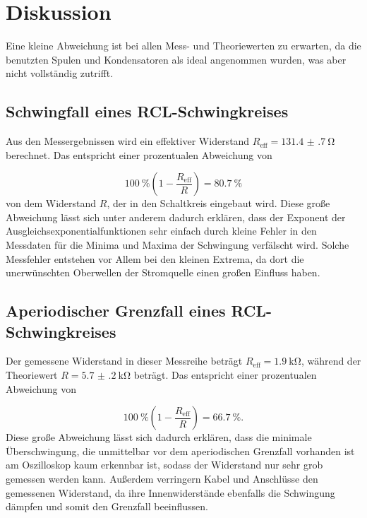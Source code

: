 \newpage

\section{Diskussion}
\label{sec:Diskussion}

Eine kleine Abweichung ist bei allen Mess- und Theoriewerten zu erwarten,
da die benutzten Spulen und Kondensatoren als ideal angenommen wurden, was
aber nicht vollständig zutrifft.

\subsection{Schwingfall eines RCL-Schwingkreises}

Aus den Messergebnissen wird ein effektiver Widerstand
$R_\text{eff} = \SI{131.4(7)}{\ohm}$ berechnet. Das entspricht einer
prozentualen Abweichung von

\begin{equation}
  \SI{100}{\percent} (1 - \frac{R_\text{eff}}{R}) = \SI{80.7}{\percent}
\end{equation}
von dem Widerstand $R$, der in den Schaltkreis eingebaut wird.
Diese große Abweichung lässt sich unter anderem dadurch erklären, dass
der Exponent der Ausgleichsexponentialfunktionen sehr einfach durch kleine
Fehler in den Messdaten für die Minima und Maxima der Schwingung verfälscht
wird. Solche Messfehler entstehen vor Allem bei den kleinen Extrema, da
dort die unerwünschten Oberwellen der Stromquelle einen großen Einfluss
haben.


\subsection{Aperiodischer Grenzfall eines RCL-Schwingkreises}

Der gemessene Widerstand in dieser Messreihe beträgt $R_\text{eff} =
\SI{1.9}{\kilo\ohm}$, während der Theoriewert
$R = \SI{5.7(2)}{\kilo\ohm}$ beträgt.
Das entspricht einer prozentualen Abweichung von

\begin{equation}
  \SI{100}{\percent} (1 - \frac{R_\text{eff}}{R}) = \SI{66.7}{\percent}.
\end{equation}
Diese große Abweichung lässt sich dadurch erklären, dass die minimale
Überschwingung, die unmittelbar vor dem aperiodischen Grenzfall vorhanden ist
am Oszilloskop kaum erkennbar ist, sodass der Widerstand nur sehr grob
gemessen werden kann.
Außerdem verringern Kabel und Anschlüsse den gemessenen Widerstand, da ihre
Innenwiderstände ebenfalls die Schwingung dämpfen und somit den Grenzfall
beeinflussen.


